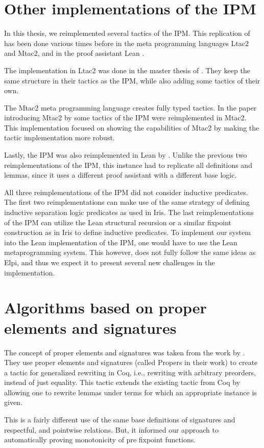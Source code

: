 \documentclass[thesis.tex]{subfiles}
\begin{document}
\section{Other implementations of the IPM}\label{sec:IPMimpl}
In this thesis, we reimplemented several tactics of the IPM. This replication of \cite{krebbersInteractiveProofsHigherorder2017} has been done various times before in the meta programming languages Ltac2 and Mtac2, and in the proof assistant Lean \cite{demouraLeanTheoremProver2015}.

The implementation in Ltac2 was done in the master thesis of  \cite{liesnikovExtendingAutomatingIris2020}. They keep the same structure in their tactics as the IPM, while also adding some tactics of their own.

The Mtac2 meta programming language creates fully typed tactics. In the paper introducing Mtac2 by  \cite{kaiserMtac2TypedTactics2018} some tactics of the IPM were reimplemented in Mtac2. This implementation focused on showing the capabilities of Mtac2 by making the tactic implementation more robust.

Lastly, the IPM was also reimplemented in Lean by  \cite{koenigImprovedInterfaceInteractive2022}. Unlike the previous two reimplementations of the IPM, this instance had to replicate all definitions and lemmas, since it uses a different proof assistant with a different base logic.

All three reimplementations of the IPM did not consider inductive predicates. The first two reimplementations can make use of the same strategy of defining inductive separation logic predicates as used in Iris. The last reimplementations of the IPM can utilize the Lean structural recursion or a similar fixpoint construction as in Iris to define inductive predicates. To implement our system into the Lean implementation of the IPM, one would have to use the Lean metaprogramming system. This however, does not fully follow the same ideas as Elpi, and thus we expect it to present several new challenges in the implementation.

\section{Algorithms based on proper elements and signatures}\label{sec:propersigproj}
The concept of proper elements and signatures was taken from the work by  \cite{sozeauNewLookGeneralized2009}. They use proper elements and signatures (called Propers in their work) to create a tactic for generalized rewriting in Coq, i.e., rewriting with arbitrary preorders, instead of just equality. This tactic extends the existing  tactic from Coq by allowing one to rewrite lemmas under terms for which an appropriate  instance is given.

This is a fairly different use of the same base definitions of signatures and respectful, and pointwise relations. But, it informed our approach to automatically proving monotonicity of pre fixpoint functions.
\end{document}
